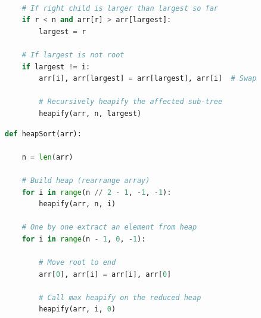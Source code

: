 \documentclass[aspectratio=1610]{beamer}
\begin{document}
\begin{frame}[fragile]
\begin{lstlisting}[language=Python]

    # If right child is larger than largest so far
    if r < n and arr[r] > arr[largest]:
        largest = r

    # If largest is not root
    if largest != i:
        arr[i], arr[largest] = arr[largest], arr[i]  # Swap

        # Recursively heapify the affected sub-tree
        heapify(arr, n, largest)
\end{lstlisting}
\end{frame}



\begin{frame}[fragile]
\begin{lstlisting}[language=Python]
def heapSort(arr):
    
    n = len(arr) 

    # Build heap (rearrange array)
    for i in range(n // 2 - 1, -1, -1):
        heapify(arr, n, i)

    # One by one extract an element from heap
    for i in range(n - 1, 0, -1):
      
        # Move root to end
        arr[0], arr[i] = arr[i], arr[0] 

        # Call max heapify on the reduced heap
        heapify(arr, i, 0)
\end{lstlisting}
\end{frame}










\end{document}
